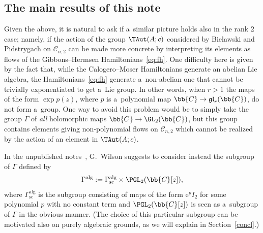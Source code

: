 \subsection{The main results of this note}

Given the above, it is natural to ask if a~similar picture holds also in the rank 2 case; namely, if the
action of the group \(\TAut(A;c)\) considered by Bielawski and Pidstrygach on \(\mathcal{C}_{n,2}\) can be
made more concrete by interpreting its elements as f\/lows of the Gibbons--Hermsen
Hamiltonians~\eqref{eq:fh}.
One dif\/f\/iculty here is given by the fact that, while the Calogero--Moser Hamiltonians generate an
abelian Lie algebra, the Hamiltonians~\eqref{eq:fh} generate a~non-abelian one that cannot be trivially
exponentiated to get a~Lie group.
In other words, when \(r>1\) the maps of the form \(\exp p(z)\), where \(p\) is a~polynomial map
\(\bb{C}\to \mathfrak{gl}_{r}(\bb{C})\), do not form a~group.
One way to avoid this problem would be to simply take the group \(\Gamma\) of \emph{all} holomorphic maps
\(\bb{C}\to \GL_{2}(\bb{C})\), but this group contains elements giving non-polynomial f\/lows on
\(\mathcal{C}_{n,2}\) which cannot be realized by the action of an element in \(\TAut(A;c)\).

In the unpublished notes~\cite{wils09}, G.~Wilson suggests to consider instead the subgroup of \(\Gamma\)
def\/ined by
\begin{gather}
\label{eq:def-Galg}
\Gamma^{\mathrm{alg}}\mathrel{:=}\Gamma^{\mathrm{alg}}_{\text{sc}}\times\PGL_{2}(\bb{C}[z]),
\end{gather}
where \(\Gamma^{\mathrm{alg}}_{\text{sc}}\) is the subgroup consisting of maps of the form \(\mathrm{e}^{p}
I_{2}\) for some polynomial \(p\) with no constant term and \(\PGL_{2}(\bb{C}[z])\) is seen as a~subgroup
of \(\Gamma\) in the obvious manner.
(The choice of this particular subgroup can be motivated also on purely algebraic grounds, as we will
explain in Section~\ref{concl}.)

